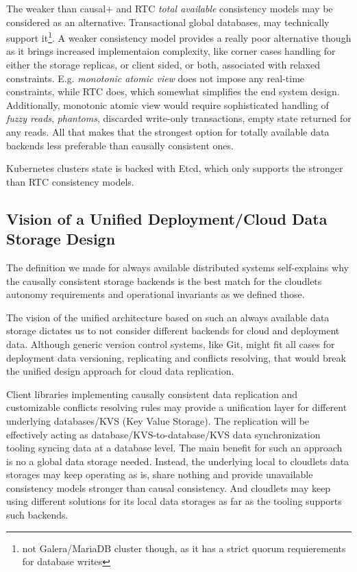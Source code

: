 \documentclass[conference]{IEEEtran}
\begin{document}
The weaker than causal+ and RTC \textit{total available}\cite{b4}
consistency models may be considered as an alternative. Transactional global
databases\cite{b5}, may technically support it\footnote{not Galera/MariaDB
cluster though, as it has a strict quorum requierements for database writes}. A
weaker consistency model provides a really poor alternative though as it brings
increased implementaion complexity, like corner cases handling for either the
storage replicas, or client sided, or both, associated with relaxed
constraints. E.g. \textit{monotonic atomic view}\cite{b4} does not impose any
real-time constraints, while RTC does, which somewhat simplifies
the end system design. Additionally, monotonic atomic view would require
sophisticated handling of \textit{fuzzy reads}\cite{b4},
\textit{phantoms}\cite{b4}, discarded write-only transactions, empty state
returned for any reads. All that makes that the strongest option for totally
available data backends less preferable than causally consistent ones.

Kubernetes clusters state is backed with Etcd, which only supports the stronger
than RTC consistency models.

\subsection{Vision of a Unified Deployment/Cloud Data Storage Design}

The definition we made for always available distributed systems self-explains
why the causally consistent storage backends is the best match for the
cloudlets autonomy requirements and operational invariants as we defined those.

The vision of the unified architecture based on such an always available data
storage dictates us to not consider different backends for cloud and deployment
data. Although generic version control systems, like Git, might fit all cases
for deployment data versioning, replicating and conflicts resolving, that would
break the unified design approach for cloud data replication.

Client libraries implementing causally consistent data replication and
customizable conflicts resolving rules may provide a unification layer for
different underlying databases/KVS (Key Value Storage). The replication will be
effectively acting as database/KVS-to-database/KVS data synchronization tooling
syncing data at a database level. The main benefit for such an approach is no a
global data storage needed. Instead, the underlying local to cloudlets data
storages may keep operating as is, share nothing and provide unavailable
consistency models stronger than causal consistency. And cloudlets may keep
using different solutions for its local data storages as far as the tooling
supports such backends.
\end{document}
